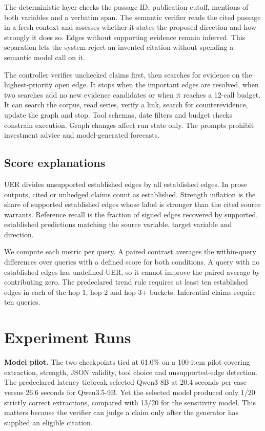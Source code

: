 \documentclass[11pt,a4paper]{article}
\newcommand{\runninglabel}{}
\newcommand{\reportpage}[1]{\newpage\renewcommand{\runninglabel}{#1}}
\begin{document}
The deterministic layer checks the passage ID, publication cutoff,
mentions of both variables and a verbatim span. The semantic verifier
reads the cited passage in a fresh context and assesses whether it
states the proposed direction and how strongly it does so. Edges without
supporting evidence remain inferred. This separation lets the system
reject an invented citation without spending a semantic model call on
it.

The controller verifies unchecked claims first, then searches for
evidence on the highest-priority open edge. It stops when the important
edges are resolved, when two searches add no new evidence candidates or
when it reaches a 12-call budget. It can search the corpus, read series,
verify a link, search for counterevidence, update the graph and stop.
Tool schemas, date filters and budget checks constrain execution. Graph
changes affect run state only. The prompts prohibit investment advice
and model-generated forecasts.

\subsection{Score explanations}\label{score-explanations}

UER divides unsupported established edges by all established edges. In
prose outputs, cited or unhedged claims count as established. Strength
inflation is the share of supported established edges whose label is
stronger than the cited source warrants. Reference recall is the fraction
of signed edges recovered by supported, established predictions matching
the source variable, target variable and direction.

We compute each metric per query. A paired contrast averages the
within-query differences over queries with a defined score for both
conditions. A query with no established edges has undefined UER, so it
cannot improve the paired average by contributing zero. The predeclared
trend rule requires at least ten established edges in each of the hop
1, hop 2 and hop 3+ buckets. Inferential claims require ten queries.

\reportpage{Experiments}

\section{Experiment Runs}\label{experiment-runs}

\textbf{Model pilot.} The two checkpoints tied at 61.0\% on a 100-item
pilot covering extraction, strength, JSON validity, tool choice and
unsupported-edge detection. The predeclared latency tiebreak selected
Qwen3-8B at 20.4 seconds per case versus 26.6 seconds for Qwen3.5-9B.
Yet the selected model produced only 1/20 strictly correct extractions,
compared with 13/20 for the sensitivity model. This matters because the
verifier can judge a claim only after the generator has supplied an
eligible citation.
\end{document}
